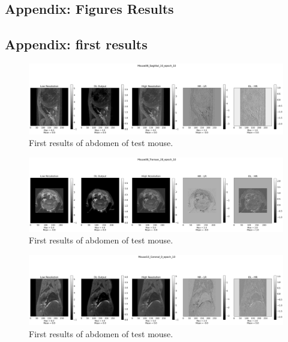 \documentclass[twocolumn]{article}
\begin{document}
\begin{appendices}
\clearpage
\newpage
\section{Appendix: Figures Results}
\subsection{Appendix: first results}
\label{Appendix: first results}
\begin{figure}[h]
    \centering
    \includegraphics[width=1\linewidth]{Mouse06_Sagittal_10_epoch_10.png}
    \caption{First results of abdomen of test mouse.}
\end{figure}

\begin{figure}[h]
    \centering
    \includegraphics[width=1\linewidth]{Mouse06_Transax_28_epoch_10.png}
    \caption{First results of abdomen of test mouse.}
\end{figure}

\begin{figure}[h]
    \centering
    \includegraphics[width=1\linewidth]{Mouse10_Coronal_0_epoch_10.png}
    \caption{First results of abdomen of test mouse.}
\end{figure}

\newpage

\end{appendices}
\end{document}
